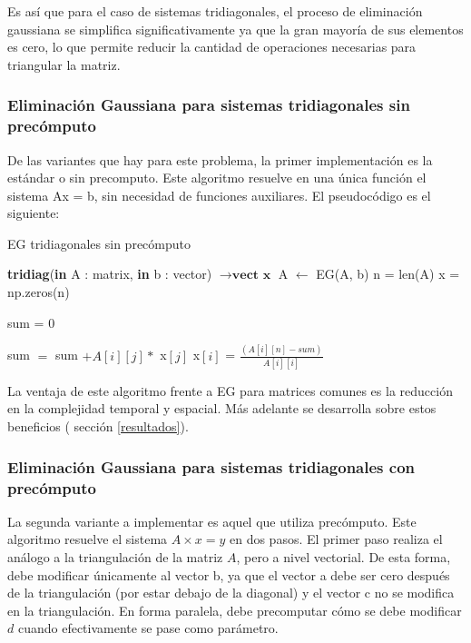  Es así que para el caso de sistemas tridiagonales, el proceso de eliminación gaussiana se simplifica significativamente ya que la gran mayoría de sus elementos es cero, lo que permite reducir la cantidad de operaciones necesarias para triangular la matriz.

 \subsubsection{Eliminación Gaussiana para sistemas tridiagonales sin precómputo}

 De las variantes que hay para este problema, la primer implementación es la estándar o sin precomputo. Este algoritmo resuelve en una única función el sistema Ax = b, sin necesidad de funciones auxiliares. El pseudocódigo es el siguiente:

 \begin{algorithm}
\caption{EG tridiagonales sin precómputo}
\begin{algorithmic}
\State \textbf{tridiag}(\textbf{in} A : matrix, \textbf{in} b : vector) $\to \textbf{vect x}$
 \State A $\gets$ EG(A, b) 
\State n = len(A)
\State x = np.zeros(n)

        \State sum = 0
        
                \State sum $=$ sum $+ A[i][j] *$ x$[j]$
             \EndIf       
            \State x$[i]$ = $\frac{(A[i][n] - sum)}{A[i][i]}$
        \EndFor
   \EndFor
{}
\end{algorithmic}
\end{algorithm}

La ventaja de este algoritmo frente a EG para matrices comunes es la reducción en la complejidad temporal y espacial. Más adelante se desarrolla sobre estos beneficios ( sección \ref{resultados}).

\subsubsection{Eliminación Gaussiana para sistemas tridiagonales con precómputo}

La segunda variante a implementar es aquel que utiliza precómputo. Este algoritmo resuelve el sistema $A \times x = y$ en dos pasos. 
El primer paso realiza el análogo a la triangulación de la matriz $A$, pero a nivel vectorial. De esta forma, debe modificar únicamente al vector b, ya que el vector a debe ser cero después de la triangulación (por estar debajo de la diagonal) y el vector c no se modifica en la triangulación. En forma paralela, debe precomputar cómo se debe modificar $d$ cuando efectivamente se pase como parámetro.


